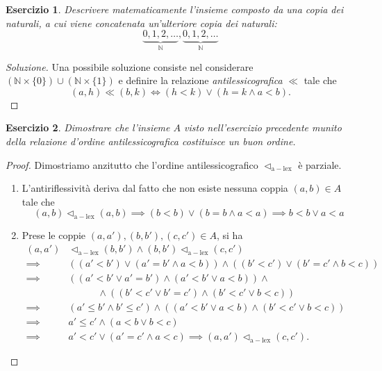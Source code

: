 \documentclass[fontsize = 11 pt, paper=A4, oneside, index=totoc, hyperref]{article}
\theoremstyle{definition}
\theoremstyle{plain}
\newtheorem{exe}{Esercizio}[section]
\newcommand{\N}{\mathbb{N}}
\newcommand{\ordine}[1]{\vartriangleleft_{\mathrm{#1}}}
\begin{document}
\begin{exe}
  Descrivere matematicamente l'insieme composto da una copia dei naturali, a cui viene concatenata un'ulteriore copia dei naturali:
  \[
  \underbrace{0,1,2,\dots}_{\N},\underbrace{0,1,2,\dots}_{\N}
  \]
\end{exe}
\begin{proof}[Soluzione]
  Una possibile soluzione consiste nel considerare \((\N \times \lbrace 0 \rbrace) \cup (\N \times \lbrace 1 \rbrace)\) e definire la relazione \emph{antilessicografica} \(\ll\) tale che
  \begin{equation}
    (a,h) \ll (b,k) \iff (h < k) \lor (h = k \land a < b).
  \end{equation}
\end{proof}
\begin{exe}
  Dimostrare che l'insieme \(A\) visto nell'esercizio precedente munito della relazione d'ordine antilessicografica costituisce un buon ordine.
\end{exe}
\begin{proof}
  Dimostriamo anzitutto che l'ordine antilessicografico \(\ordine{a-lex}\) è parziale.
  \begin{enumerate}
    \item L'antiriflessività deriva dal fatto che non esiste nessuna coppia \((a,b) \in A\) tale che
    \[
    (a,b) \ordine{a-lex} (a, b) \implies (b < b) \lor (b = b \land a < a) \implies b < b \lor a < a
    \]
    \item Prese le coppie \((a,a'), (b,b'), (c,c') \in A\), si ha
    \begin{align*}
    (a,a') &\ordine{a-lex} (b,b') \land (b,b') \ordine{a-lex} (c,c') \\
    \implies & ((a' < b') \lor (a' = b' \land a < b)) \land ((b' < c') \lor (b' = c' \land b < c)) \\
    \implies & ((a' < b' \lor a' = b') \land (a' < b' \lor a < b)) \land\\
    & \quad\quad\quad \land ((b' < c' \lor b' = c') \land (b' < c' \lor b < c)) \\
    \implies & (a' \le b' \land b' \le c') \land ((a' < b' \lor a < b) \land (b' < c' \lor b < c)) \\
    \implies & a' \le c' \land (a < b \lor b < c) \\
    \implies & a' < c' \lor (a' = c' \land a < c) \implies (a,a') \ordine{a-lex} (c,c').
    \end{align*}
  \end{enumerate}
\end{proof}
\end{document}
